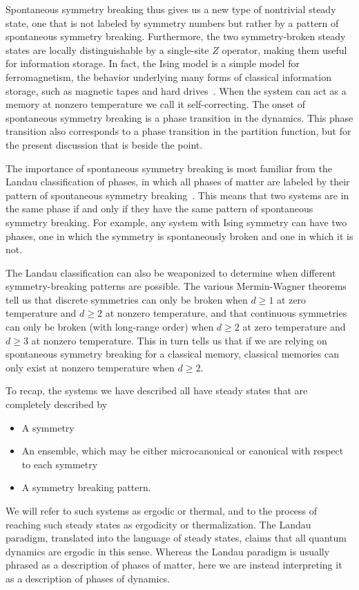 Spontaneous symmetry breaking thus gives us a new type of nontrivial steady state, one that is not labeled by symmetry numbers but rather by a pattern of spontaneous symmetry breaking. Furthermore, the two symmetry-broken steady states are locally distinguishable by a single-site $Z$ operator, making them useful for information storage. In fact, the Ising model is a simple model for ferromagnetism, the behavior underlying many forms of classical information storage, such as magnetic tapes and hard drives~\cite{Brown2016Finite}. When the system can act as a memory at nonzero temperature we call it self-correcting.
The onset of spontaneous symmetry breaking is a phase transition in the dynamics. This phase transition also corresponds to a phase transition in the partition function, but for the present discussion that is beside the point.

The importance of spontaneous symmetry breaking is most familiar from the Landau classification of phases, in which all phases of matter are labeled by their pattern of spontaneous symmetry breaking~\cite{Landau1980Statistical}. This means that two systems are in the same phase if and only if they have the same pattern of spontaneous symmetry breaking. For example, any system with Ising symmetry can have two phases, one in which the symmetry is spontaneously broken and one in which it is not.

The Landau classification can also be weaponized to determine when different symmetry-breaking patterns are possible. The various Mermin-Wagner theorems tell us that discrete symmetries can only be broken when $d\ge 1$ at zero temperature and $d\ge 2$ at nonzero temperature, and that continuous symmetries can only be broken (with long-range order) when $d \ge 2$ at zero temperature and $d \ge 3$ at nonzero temperature. This in turn tells us that if we are relying on spontaneous symmetry breaking for a classical memory, classical memories can only exist at nonzero temperature when $d \ge 2$.

To recap, the systems we have described all have steady states that are completely described by
\begin{itemize}
\item A symmetry
\item An ensemble, which may be either microcanonical or canonical with respect to each symmetry
\item A symmetry breaking pattern.
\end{itemize}
We will refer to such systems as ergodic or thermal, and to the process of reaching such steady states as ergodicity or thermalization.
The Landau paradigm, translated into the language of steady states, claims that all quantum dynamics are ergodic in this sense.
Whereas the Landau paradigm is usually phrased as a description of phases of matter, here we are instead interpreting it as a description of phases of dynamics. 

